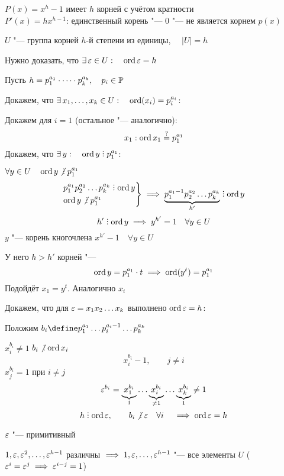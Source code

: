 \begin{eproof}
	\item $ P(x) = x^h - 1 $ имеет $ h $ корней с учётом кратности \\
	$ P'(x) = hx^{h - 1} $: единственный корень "--- 0 "--- не является корнем $ p(x) $
	\item $ U $ "--- группа корней $ h $-й степени из единицы, $ \quad |U| = h $

	Нужно доказать, что $ \exists\, \varepsilon \in U : \quad \operatorname{ord} \varepsilon = h $

	Пусть $ h = p_1^{a_1} \cdot \dots \cdot p_k^{a_k}, \quad p_i \in \mathbb{P} $

	Докажем, что $ \exists\, x_1, \dots, x_k \in U : \quad \operatorname{ord} (x_i) = p_i^{a_i} $:

	Докажем для $ i = 1 $ (остальное "--- аналогично):
	$$ x_1 : \operatorname{ord} x_1 \stackrel?= p_1^{a_1} $$
	Докажем, что $ \exist y : \quad \ord y \divby p_1^{a_1} $:

	 $ \forall y \in U \quad \ord y \ndivby p_1^{a_1} $
	$$
	\begin{rcases}
		p_1^{a_1}p_2^{a_2} \dots p_k^{a_k} \divby \ord y \\
		\ord y \ndivby p_1^{a_1}
	\end{rcases} \implies \underbrace{p_1^{a_1 - 1}p_2^{a_2} \dots p_k^{a_k}}_{h'} \divby \ord y $$
	$$ h' \divby \ord y \implies y^{h'} = 1 \quad \forall y \in U $$
	$ y $ "--- корень кногочлена $ x^{h'} - 1 \quad \forall y \in U $

	У него $ h > h' $ корней "--- \contra
	$$ \operatorname{ord} y = p_1^{a_1} \cdot t \implies \operatorname{ord}(y^t) = p_1^{a_1} $$
	Подойдёт $ x_1 = y^t $. Аналогично $ x_i $

	Докажем, что для $ \varepsilon = x_1x_2 \dots x_k $ выполнено $ \operatorname{ord} \varepsilon = h $:

	Положим $ b_i \define p_1^{a_1} \dots p_i^{a_i - 1} \dots p_k^{a_k} $

	$ x_i^{b_i} \ne 1 $ \as $ b_i \ndivby \ord x_i $
	$$ x_i^{b_i} - 1, \qquad j \ne i $$
	$ x_j^{b_i} = 1 $ при $ i \ne j $
	$$ \varepsilon^{b_i} = \underbrace{x_1^{b_i}}_1 \dots \underbrace{x_i^{b_i}}_{\ne 1} \dots \underbrace{x_k^{b_i}}_1 \ne 1 $$
	$$ h \divby \ord \veps, \qquad b_i \ndivby \veps \quad \forall i \quad \implies \ord \veps = h $$
	\item $ \varepsilon $ "--- примитивный

	$ 1, \varepsilon, \varepsilon^2, \dots, \varepsilon^{h - 1} $ различны $ \implies 1, \varepsilon, \dots, \varepsilon^{h - 1} $ "--- все элементы $ U $ ($ \varepsilon^i = \varepsilon^j \implies \varepsilon^{i - j} = 1 $)
\end{eproof}

